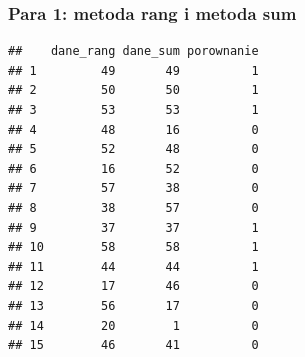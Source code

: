 \documentclass[12pt,a4paper]{report}
\begin{document}
{\subsubsection{Para 1: metoda rang i metoda
sum}\label{para-1-metoda-rang-i-metoda-sum}

\begin{Shaded}
\begin{Highlighting}[]
\NormalTok{(}\NormalTok{,}\NormalTok{)}

\NormalTok{:}
  \NormalTok{\}}
\NormalTok{\}}
\NormalTok{)}
\end{Highlighting}
\end{Shaded}

\begin{verbatim}
##    dane_rang dane_sum porownanie
## 1         49       49          1
## 2         50       50          1
## 3         53       53          1
## 4         48       16          0
## 5         52       48          0
## 6         16       52          0
## 7         57       38          0
## 8         38       57          0
## 9         37       37          1
## 10        58       58          1
## 11        44       44          1
## 12        17       46          0
## 13        56       17          0
## 14        20        1          0
## 15        46       41          0
\end{verbatim}

\begin{Shaded}
\begin{Highlighting}[]
\NormalTok{(}
\NormalTok{(}\NormalTok{,}\NormalTok{)}
\end{Highlighting}
\end{Shaded}

}
\end{document}
